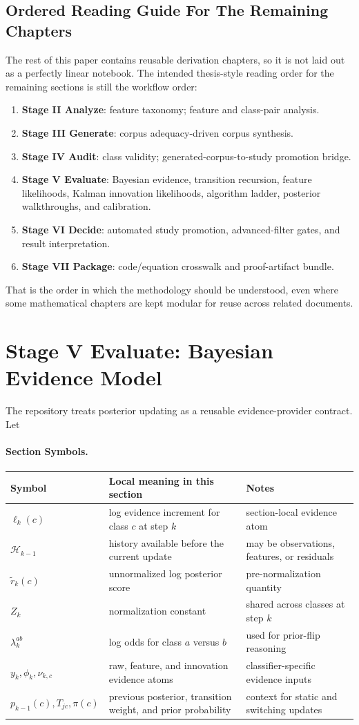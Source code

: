 \documentclass[11pt]{article}
\newcommand{\sectionsymbol}[3]{#1 & #2 & #3 \\}
\newcommand{\sectionsymbols}[1]{%
\begin{center}
\small
\setlength{\tabcolsep}{4pt}
\begin{tabularx}{0.95\textwidth}{>{\raggedright\arraybackslash}p{0.16\textwidth}X>{\raggedright\arraybackslash}p{0.18\textwidth}}
\toprule
Symbol & Local meaning in this section & Notes \\
\midrule
#1
\bottomrule
\end{tabularx}
\end{center}
}
\begin{document}
\subsection*{Ordered Reading Guide For The Remaining Chapters}
The rest of this paper contains reusable derivation chapters, so it is not laid
out as a perfectly linear notebook. The intended thesis-style reading order for
the remaining sections is still the workflow order:
\begin{enumerate}[leftmargin=1.5em]
  \item \textbf{Stage II Analyze}: feature taxonomy; feature and class-pair analysis.
  \item \textbf{Stage III Generate}: corpus adequacy-driven corpus synthesis.
  \item \textbf{Stage IV Audit}: class validity; generated-corpus-to-study promotion bridge.
  \item \textbf{Stage V Evaluate}: Bayesian evidence, transition recursion, feature likelihoods, Kalman innovation likelihoods, algorithm ladder, posterior walkthroughs, and calibration.
  \item \textbf{Stage VI Decide}: automated study promotion, advanced-filter gates, and result interpretation.
  \item \textbf{Stage VII Package}: code/equation crosswalk and proof-artifact bundle.
\end{enumerate}
That is the order in which the methodology should be understood, even where
some mathematical chapters are kept modular for reuse across related documents.

\section{Stage V Evaluate: Bayesian Evidence Model}
The repository treats posterior updating as a reusable evidence-provider contract. Let
\paragraph{Section Symbols.}
\sectionsymbols{
\sectionsymbol{\(\ell_k(c)\)}{log evidence increment for class \(c\) at step \(k\)}{section-local evidence atom}
\sectionsymbol{\(\mathcal{H}_{k-1}\)}{history available before the current update}{may be observations, features, or residuals}
\sectionsymbol{\(\tilde{r}_k(c)\)}{unnormalized log posterior score}{pre-normalization quantity}
\sectionsymbol{\(Z_k\)}{normalization constant}{shared across classes at step \(k\)}
\sectionsymbol{\(\lambda_k^{ab}\)}{log odds for class \(a\) versus \(b\)}{used for prior-flip reasoning}
\sectionsymbol{\(y_k, \phi_k, \nu_{k,c}\)}{raw, feature, and innovation evidence atoms}{classifier-specific evidence inputs}
\sectionsymbol{\(p_{k-1}(c), T_{jc}, \pi(c)\)}{previous posterior, transition weight, and prior probability}{context for static and switching updates}
}
\end{document}
